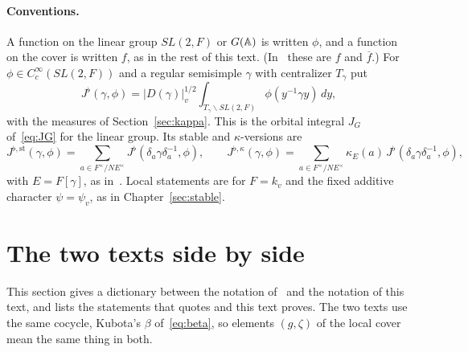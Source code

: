 \paragraph{Conventions.} A function on the linear group $SL(2,F)$ or
$G(\mathbb{A})$ is written $\phi$, and a function on the cover is written $f$, as
in the rest of this text. (In~\cite{JC26} these are $f$ and
$\overline f$.) For $\phi\in C_c^\infty(SL(2,F))$ and a regular semisimple
$\gamma$ with centralizer $T_\gamma$ put
\[
J^\flat(\gamma,\phi)=|D(\gamma)|_v^{1/2}\int_{T_\gamma\backslash SL(2,F)}
\phi(y^{-1}\gamma y)\,dy,
\]
with the measures of Section~\ref{sec:kappa}. This is the orbital
integral $J_G$ of~\eqref{eq:JG} for the linear group. Its stable and
$\kappa$-versions are
\[
J^{\flat,\mathrm{st}}(\gamma,\phi)=\sum_{a\in F^\times/N E^\times}J^\flat(
\delta_a\gamma\delta_a^{-1},\phi),\qquad
J^{\flat,\kappa}(\gamma,\phi)=\sum_{a\in F^\times/N E^\times}\kappa_E(a)\,
J^\flat(\delta_a\gamma\delta_a^{-1},\phi),
\]
with $E=F[\gamma]$, as in~\cite{LL79}. Local statements are for $F=k_v$
and the fixed additive character $\psi=\psi_v$, as in
Chapter~\ref{sec:stable}.

\section{The two texts side by side}\label{sec:dictionary}

This section gives a dictionary between the notation of~\cite{JC26} and
the notation of this text, and lists the statements that \cite{JC26}
quotes and this text proves. The two texts use the same cocycle, Kubota's
$\beta$ of~\eqref{eq:beta}, so elements $(g,\zeta)$ of the local cover
mean the same thing in both.

